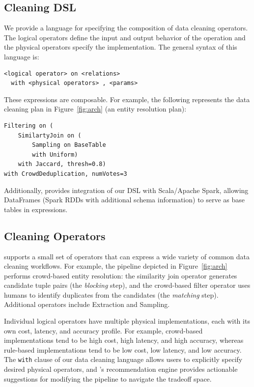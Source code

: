 \subsection{Cleaning DSL}
\label{sec:dsl}
We provide a language for specifying the composition of data cleaning operators.
The logical operators define the input and output behavior of the operation and 
the physical operators specify the implementation.
The general syntax of this language is:
{\scriptsize
\begin{lstlisting}
<logical operator> on <relations>
  with <physical operators> , <params>
\end{lstlisting}
}

These expressions are composable. For example, the following represents the data cleaning plan in Figure~\ref{fig:arch} (an entity resolution plan):
{\scriptsize
\begin{lstlisting} 
Filtering on (
    SimilartyJoin on (
        Sampling on BaseTable
        with Uniform)
    with Jaccard, thresh=0.8) 
with CrowdDeduplication, numVotes=3
\end{lstlisting}
}
Additionally, \sys provides integration of our DSL with Scala/Apache Spark, allowing DataFrames (Spark RDDs with additional schema information) to serve as base tables in expressions.

\subsection{Cleaning Operators}
\label{sec:operators}
\sys supports a small set of operators that can express a wide variety of common data cleaning workflows. 
For example, the pipeline depicted in Figure~\ref{fig:arch} performs crowd-based entity resolution: the similarity join operator generates candidate tuple pairs (the \textit{blocking} step), and the crowd-based filter operator uses humans to identify duplicates from the candidates (the \textit{matching} step). 
Additional operators include Extraction and Sampling.

Individual logical operators have multiple physical implementations, each with its own cost, latency, and accuracy profile. 
For example, crowd-based implementations tend to be high cost, high latency, and high accuracy, whereas rule-based implementations tend to be low cost, low latency, and low accuracy. 
The \texttt{with} clause of our data cleaning language allows users to explicitly specify desired physical operators, and \sys's recommendation engine provides actionable suggestions for modifying the pipeline to navigate the tradeoff space.





